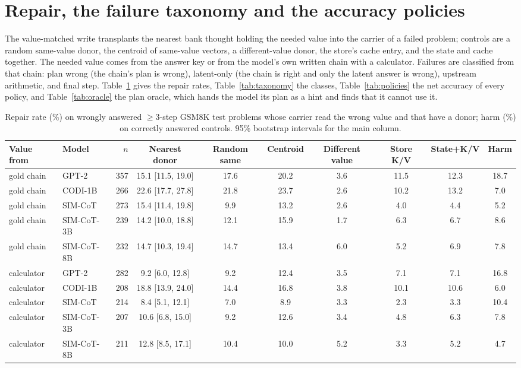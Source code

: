 \section{Repair, the failure taxonomy and the accuracy policies}\label{app:repair}

The value-matched write transplants the nearest bank thought holding the needed value into the carrier of a failed problem; controls are a random same-value donor, the centroid of same-value vectors, a different-value donor, the store's cache entry, and the state and cache together. The needed value comes from the answer key or from the model's own written chain with a calculator. Failures are classified from that chain: plan wrong (the chain's plan is wrong), latent-only (the chain is right and only the latent answer is wrong), upstream arithmetic, and final step. Table~\ref{tab:repair} gives the repair rates, Table~\ref{tab:taxonomy} the classes, Table~\ref{tab:policies} the net accuracy of every policy, and Table~\ref{tab:oracle} the plan oracle, which hands the model its plan as a hint and finds that it cannot use it.

\begin{table}[htbp]
\caption{Repair rate (\%) on wrongly answered $\geq 3$-step GSM8K test problems whose carrier read the wrong value and that have a donor; harm (\%) on correctly answered controls. 95\% bootstrap intervals for the main column.}
\label{tab:repair}
\centering
\scriptsize
\setlength{\tabcolsep}{3pt}
\begin{tabular}{llrccccccc}
\toprule
Value from & Model & $n$ & Nearest donor & Random same & Centroid & Different value & Store K/V & State+K/V & Harm \\
\midrule
gold chain & GPT-2 & 357 & 15.1 [11.5, 19.0] & 17.6 & 20.2 & 3.6 & 11.5 & 12.3 & 18.7 \\
gold chain & CODI-1B & 266 & 22.6 [17.7, 27.8] & 21.8 & 23.7 & 2.6 & 10.2 & 13.2 & 7.0 \\
gold chain & SIM-CoT & 273 & 15.4 [11.4, 19.8] & 9.9 & 13.2 & 2.6 & 4.0 & 4.4 & 5.2 \\
gold chain & SIM-CoT-3B & 239 & 14.2 [10.0, 18.8] & 12.1 & 15.9 & 1.7 & 6.3 & 6.7 & 8.6 \\
gold chain & SIM-CoT-8B & 232 & 14.7 [10.3, 19.4] & 14.7 & 13.4 & 6.0 & 5.2 & 6.9 & 7.8 \\
\midrule
calculator & GPT-2 & 282 & 9.2 [6.0, 12.8] & 9.2 & 12.4 & 3.5 & 7.1 & 7.1 & 16.8 \\
calculator & CODI-1B & 208 & 18.8 [13.9, 24.0] & 14.4 & 16.8 & 3.8 & 10.1 & 10.6 & 6.0 \\
calculator & SIM-CoT & 214 & 8.4 [5.1, 12.1] & 7.0 & 8.9 & 3.3 & 2.3 & 3.3 & 10.4 \\
calculator & SIM-CoT-3B & 207 & 10.6 [6.8, 15.0] & 9.2 & 12.6 & 3.4 & 4.8 & 6.3 & 7.8 \\
calculator & SIM-CoT-8B & 211 & 12.8 [8.5, 17.1] & 10.4 & 10.0 & 5.2 & 3.3 & 5.2 & 4.7 \\
\bottomrule
\end{tabular}
\end{table}

